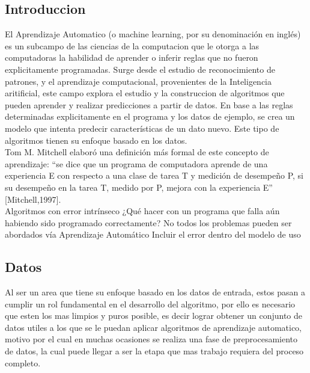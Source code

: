 \documentclass[a4paper,12pt,spanish]{book}
\begin{document}
    \subsection{Introduccion}
      El Aprendizaje Automatico (o machine learning, por su denominación en inglés) es un subcampo de las ciencias de la computacion que le otorga a las computadoras la habilidad de aprender o inferir reglas que no fueron explicitamente programadas.
      Surge desde el estudio de reconocimiento de patrones, y el aprendizaje computacional, provenientes de la Inteligencia aritificial, este campo explora el estudio y la construccion de algoritmos
      que pueden aprender y realizar predicciones a partir de datos. En base a las reglas determinadas explicitamente en el programa y los datos de ejemplo, se crea un modelo que intenta predecir
      características de un dato nuevo. Este tipo de algoritmos tienen su enfoque basado en los datos.\\
      Tom M. Mitchell elaboró una definición más formal de este concepto de aprendizaje: “se dice que un programa de computadora aprende de una experiencia E con respecto a una clase 
      de tarea T y medición de desempeño P, si su desempeño en la tarea T, medido por P, mejora con la experiencia E” [Mitchell,1997].\\
      Algoritmos con error intrínseco
      ¿Qué hacer con un programa que falla aún habiendo sido programado correctamente?
      No todos los problemas pueden ser abordados vía Aprendizaje Automático
      Incluir el error dentro del modelo de uso

    \subsection{Datos}
      Al ser un area que tiene su enfoque basado en los datos de entrada, estos pasan a cumplir un rol fundamental en el desarrollo del algoritmo, por ello es necesario que 
      esten los mas limpios y puros posible, es decir lograr obtener un conjunto de datos utiles a los que se le puedan aplicar algoritmos de aprendizaje automatico, 
      motivo por el cual en muchas ocasiones se realiza una fase de preprocesamiento de datos, la cual puede llegar a ser la etapa que mas trabajo requiera del proceso completo. 
\end{document}
